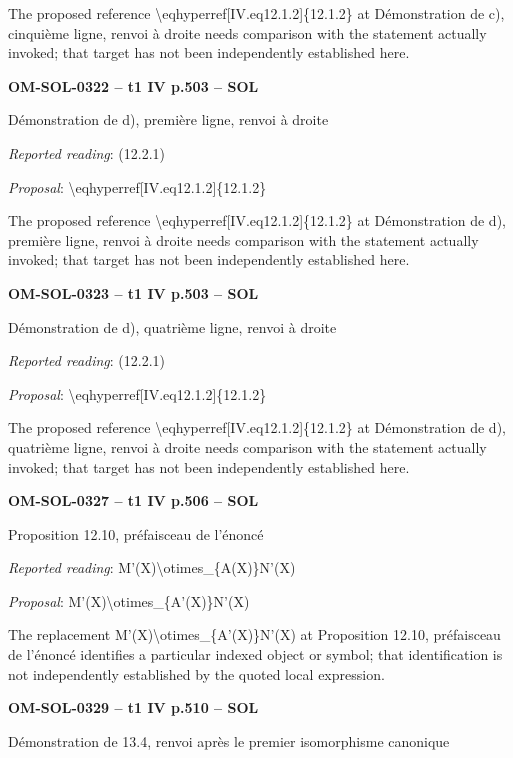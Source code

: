 The proposed reference \textbackslash{}eqhyperref[IV.eq12.1.2]\{12.1.2\} at Démonstration de c), cinquième ligne, renvoi à droite needs comparison with the statement actually invoked; that target has not been independently established here.\par
\par\noindent\textbf{OM-SOL-0322 -- t1 IV p.503 -- SOL}\par
Démonstration de d), première ligne, renvoi à droite\par
\emph{Reported reading}: (12.2.1)\par
\emph{Proposal}: \textbackslash{}eqhyperref[IV.eq12.1.2]\{12.1.2\}\par
The proposed reference \textbackslash{}eqhyperref[IV.eq12.1.2]\{12.1.2\} at Démonstration de d), première ligne, renvoi à droite needs comparison with the statement actually invoked; that target has not been independently established here.\par
\par\noindent\textbf{OM-SOL-0323 -- t1 IV p.503 -- SOL}\par
Démonstration de d), quatrième ligne, renvoi à droite\par
\emph{Reported reading}: (12.2.1)\par
\emph{Proposal}: \textbackslash{}eqhyperref[IV.eq12.1.2]\{12.1.2\}\par
The proposed reference \textbackslash{}eqhyperref[IV.eq12.1.2]\{12.1.2\} at Démonstration de d), quatrième ligne, renvoi à droite needs comparison with the statement actually invoked; that target has not been independently established here.\par
\par\noindent\textbf{OM-SOL-0327 -- t1 IV p.506 -- SOL}\par
Proposition 12.10, préfaisceau de l'énoncé\par
\emph{Reported reading}: M'(X)\textbackslash{}otimes\_\{A(X)\}N'(X)\par
\emph{Proposal}: M'(X)\textbackslash{}otimes\_\{A'(X)\}N'(X)\par
The replacement M'(X)\textbackslash{}otimes\_\{A'(X)\}N'(X) at Proposition 12.10, préfaisceau de l'énoncé identifies a particular indexed object or symbol; that identification is not independently established by the quoted local expression.\par
\par\noindent\textbf{OM-SOL-0329 -- t1 IV p.510 -- SOL}\par
Démonstration de 13.4, renvoi après le premier isomorphisme canonique\par
